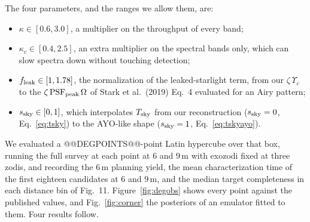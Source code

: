 \documentclass[11pt,a4paper]{article}
\begin{document}
The four parameters, and the ranges we allow them, are:
\begin{itemize}
\item $\kappa \in [0.6, 3.0]$, a multiplier on the throughput of every band;
\item $\kappa_c \in [0.4, 2.5]$, an extra multiplier on the spectral bands only, which can slow
  spectra down without touching detection;
\item $f_{\rm leak} \in [1, 1.78]$, the normalization of the leaked-starlight term, from our
  $\zeta\,\Upsilon_c$ to the $\zeta\,{\rm PSF}_{\rm peak}\,\Omega$ of Stark et al.\ (2019)
  Eq.~4 evaluated for an Airy pattern;
\item $s_{\rm sky} \in [0, 1]$, which interpolates $T_{\rm sky}$ from our reconstruction
  ($s_{\rm sky} = 0$, Eq.~\ref{eq:tsky}) to the AYO-like shape ($s_{\rm sky} = 1$,
  Eq.~\ref{eq:tskyayo}).
\end{itemize}
We evaluated a @@DEGPOINTS@@-point Latin hypercube over that box, running the full survey at each
point at 6 and $9\,$m with exozodi fixed at three zodis, and recording the $6\,$m planning yield,
the mean characterization time of the first eighteen candidates at 6 and $9\,$m, and the median
target completeness in each distance bin of Fig.~11. Figure~\ref{fig:degobs} shows every point
against the published values, and Fig.~\ref{fig:corner} the posteriors of an emulator fitted to
them. Four results follow.
\end{document}
